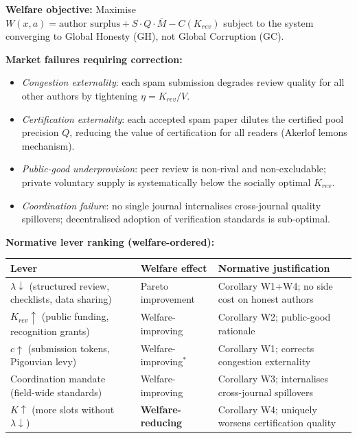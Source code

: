 \documentclass{article}
\begin{document}
\begin{tcolorbox}[boxstyle, title={Box S1\quad Normative Policy Agenda: Welfare Priorities and Justifications}]
\small
\noindent\textbf{Welfare objective:}\;
Maximise $W(x,a) = \text{author surplus} + S \cdot Q \cdot \bar{M} - C(K_{rev})$ subject to the system converging to Global Honesty (GH), not Global Corruption (GC).

\medskip
\noindent\textbf{Market failures requiring correction:}
\begin{itemize}[noitemsep, topsep=2pt, leftmargin=*]
  \item \textit{Congestion externality}: each spam submission degrades review quality for all other authors by tightening $\eta = K_{rev}/V$.
  \item \textit{Certification externality}: each accepted spam paper dilutes the certified pool precision $Q$, reducing the value of certification for all readers (Akerlof lemons mechanism).
  \item \textit{Public-good underprovision}: peer review is non-rival and non-excludable; private voluntary supply is systematically below the socially optimal $K_{rev}$.
  \item \textit{Coordination failure}: no single journal internalises cross-journal quality spillovers; decentralised adoption of verification standards is sub-optimal.
\end{itemize}

\medskip
\noindent\textbf{Normative lever ranking (welfare-ordered):}

\smallskip
\noindent\begin{tabular}{@{}p{6.0cm}p{3.0cm}p{4.5cm}@{}}
Lever & Welfare effect & Normative justification \\
\midrule
$\lambda\downarrow$ (structured review, checklists, data sharing) & Pareto improvement & Corollary W1+W4; no side cost on honest authors \\
$K_{rev}\uparrow$ (public funding, recognition grants) & Welfare-improving & Corollary W2; public-good rationale \\
$c\uparrow$ (submission tokens, Pigouvian levy) & Welfare-improving$^*$ & Corollary W1; corrects congestion externality \\
Coordination mandate (field-wide standards) & Welfare-improving & Corollary W3; internalises cross-journal spillovers \\
$K\uparrow$ (more slots without $\lambda\downarrow$) & \textbf{Welfare-reducing} & Corollary W4; uniquely worsens certification quality \\
\end{tabular}


\end{tcolorbox}
\end{document}

